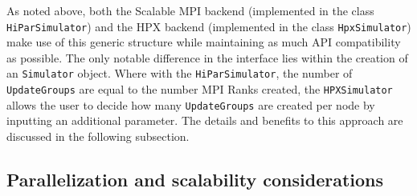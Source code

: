 \documentclass{sig-alternate}
\newcommand{\ctype}[1]{\texttt{{{#1}}}}
\newcommand{\upp}{\vspace*{-0.5em}}
\newcommand{\up}{\vspace*{-0.25em}}
\begin{document}
As noted above, both the Scalable MPI backend (implemented in the class
\ctype{HiParSimulator}) and the HPX backend (implemented in the class \ctype{HpxSimulator})
make use of this generic structure while maintaining as much API compatibility as
possible. The only notable difference in the interface lies within the creation
of an \ctype{Simulator} object. Where with the \ctype{HiParSimulator}, the number of
\ctype{UpdateGroups} are equal to the number MPI Ranks created, the \ctype{HPXSimulator} allows the user to decide
how many \ctype{UpdateGroups} are created per node by inputting an additional parameter. The
details and benefits to this approach are discussed in the following subsection.

\subsection{Parallelization and scalability considerations}
\label{sec:implementation:parallelization}
\end{document}
